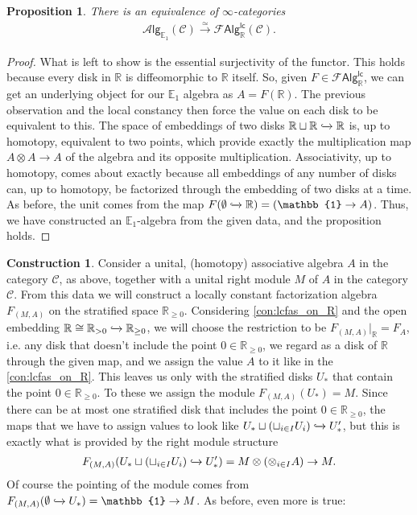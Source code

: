 \documentclass[12pt,a4paper]{article}
\newcounter{counter} \numberwithin{counter}{section}
\theoremstyle{definition}
\newtheorem{construction}[counter]{Construction}
\theoremstyle{plain}
\newtheorem{proposition}[counter]{Proposition}
\theoremstyle{remark}
\newcommand{\catC}{\mathscr{C}}
\newcommand{\lcfa}{\mathscr{F} \mathsf{Alg}^{\mathsf{lc}}}
\newcommand{\alg}[1]{\mathscr{A} \mathsf{lg}_{#1}}
\newcommand{\hoint}{\mathbb{R}_{\geq 0}}
\begin{document}
\begin{proposition}\label{prop:R_gives_E1}
    There is an equivalence of $\infty$-categories
    \begin{align}
        \alg{\mathbb{E}_1}(\catC) \xrightarrow{\simeq} \lcfa_{\mathbb{R}} (\catC).
    \end{align}
\end{proposition}

\begin{proof}
    What is left to show is the essential surjectivity of the functor. This holds because every disk in $\mathbb{R}$ is diffeomorphic to $\mathbb{R}$ itself. So, given $F \in \lcfa_{\mathbb{R}}$, we can get an underlying object for our $\mathbb{E}_1$ algebra as $A = F(\mathbb{R})$. The previous observation and the local constancy then force the value on each disk to be equivalent to this. The space of embeddings of two disks $\mathbb{R} \sqcup \mathbb{R} \xhookrightarrow{} \mathbb{R}$ is, up to homotopy, equivalent to two points, which provide exactly the multiplication map $ A \otimes A \rightarrow A$ of the algebra and its opposite multiplication.  Associativity, up to homotopy, comes about exactly because all embeddings of any number of disks can, up to homotopy, be factorized through the embedding of two disks at a time. As before, the unit comes from the map $F(\emptyset \xhookrightarrow{} \mathbb{R}) = (\mathbb{1} \rightarrow A)$. Thus, we have constructed an $\mathbb{E}_1$-algebra from the given data, and the proposition holds.
\end{proof}

\begin{construction}\label{con:lcfas_on_hoint}
    Consider a unital, (homotopy) associative algebra $A$ in the category $\catC$, as above, together with a unital right module $M$ of $A$ in the category $\catC$. From this data we will construct a locally constant factorization algebra $F_{(M, A)}$ on the stratified space $\hoint$. Considering \cref{con:lcfas_on_R} and the open embedding $\mathbb{R} \cong \mathbb{R}_{>0} \xhookrightarrow{} \hoint$, we will choose the restriction to be $F_{(M,A)}|_{\mathbb{R}} = F_A$, i.e. any disk that doesn't include the point $0 \in \hoint$, we regard as a disk of $\mathbb{R}$ through the given map, and we assign the value $A$ to it like in the \cref{con:lcfas_on_R}. This leaves us only with the stratified disks $U_*$ that contain the point $0 \in \hoint$. To these we assign the module $F_{(M,A)}(U_*) = M$. Since there can be at most one stratified disk that includes the point $0 \in \hoint$, the maps that we have to assign values to look like $U_* \sqcup (\sqcup_{i \in I} U_i) \xhookrightarrow{} U'_*$, but this is exactly what is provided by the right module structure
    \begin{align}
        F_{(M,A)} (U_* \sqcup (\sqcup_{i \in I} U_i) \xhookrightarrow{} U'_*) = M \otimes (\otimes_{i \in I} A) \rightarrow M.
    \end{align}
    Of course the pointing of the module comes from $F_{(M,A)}(\emptyset \xhookrightarrow{} U_*) = \mathbb{1} \rightarrow M$. As before, even more is true:
\end{construction}
\end{document}
